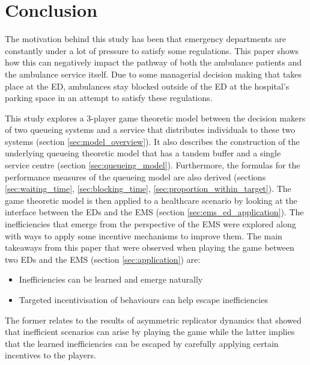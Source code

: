 \section{Conclusion}

The motivation behind this study has been that emergency departments are 
constantly under a lot of pressure to satisfy some regulations. 
This paper shows how this can negatively impact the pathway of both the 
ambulance patients and the ambulance service itself.
Due to some managerial decision making that takes place at the ED, ambulances 
stay blocked outside of the ED at the hospital's parking space in an attempt
to satisfy these regulations.

This study explores a 3-player game theoretic model between the decision makers 
of two queueing systems and a service that distributes individuals to these two
systems (section \ref{sec:model_overview}).
It also describes the construction of the underlying queueing theoretic model 
that has a tandem buffer and a single service centre (section 
\ref{sec:queueing_model}).
Furthermore, the formulas for the performance measures of the queueing model 
are also derived (sections \ref{sec:waiting_time}, \ref{sec:blocking_time}, 
\ref{sec:proportion_within_target}). 
The game theoretic model is then applied to a healthcare scenario by looking at
the interface between the EDs and the EMS (section 
\ref{sec:ems_ed_application}).
The inefficiencies that emerge from the perspective of the EMS were explored 
along with ways to apply some incentive mechanisms to improve them.
The main takeaways from this paper that were observed when playing the game
between two EDs and the EMS (section \ref{sec:application}) are:
\begin{itemize}
    \item Inefficiencies can be learned and emerge naturally
    \item Targeted incentivisation of behaviours can help escape inefficiencies
\end{itemize}
The former relates to the results of asymmetric replicator dynamics that showed 
that inefficient scenarios can arise by playing the game while the latter 
implies that the learned inefficiencies can be escaped by carefully applying 
certain incentives to the players.

